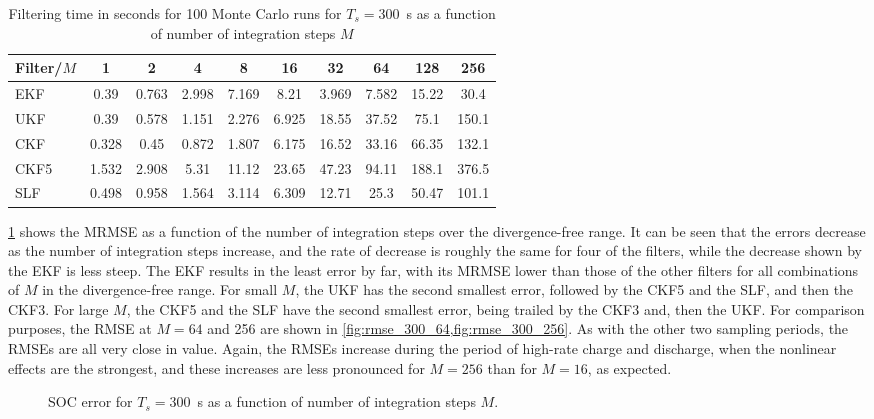 \documentclass[../zhang_thesis.tex]{subfiles}
\begin{document}
\begin{table}[h]
\centering
\caption{Filtering time in seconds for 100 Monte Carlo runs for $T_s=300$~s as a function of number of integration steps $M$}
\begin{tabular}{@{}lccccccccc@{}}
\toprule
Filter/$M$ & 1     & 2     & 4     & 8     & 16    & 32    & 64    & 128   & 256   \\ \midrule
EKF        & 0.39  & 0.763 & 2.998 & 7.169 & 8.21  & 3.969 & 7.582 & 15.22 & 30.4  \\
UKF        & 0.39  & 0.578 & 1.151 & 2.276 & 6.925 & 18.55 & 37.52 & 75.1  & 150.1 \\
CKF        & 0.328 & 0.45  & 0.872 & 1.807 & 6.175 & 16.52 & 33.16 & 66.35 & 132.1 \\
CKF5       & 1.532 & 2.908 & 5.31  & 11.12 & 23.65 & 47.23 & 94.11 & 188.1 & 376.5 \\
SLF        & 0.498 & 0.958 & 1.564 & 3.114 & 6.309 & 12.71 & 25.3  & 50.47 & 101.1 \\ \bottomrule
\end{tabular}
\label{tab:time_300}
\end{table}

\cref{fig:mrmse_300} shows the MRMSE as a function of the number of integration steps over the divergence-free range. It can be seen that the errors decrease as the number of integration steps increase, and the rate of decrease is roughly the same for four of the filters, while the decrease shown by the EKF is less steep. The EKF results in the least error by far, with its MRMSE lower than those of the other filters for all combinations of $M$ in the divergence-free range. For small $M$, the UKF has the second smallest error, followed by the CKF5 and the SLF, and then the CKF3. For large $M$, the CKF5 and the SLF have the second smallest error, being trailed by the CKF3 and, then the UKF. For comparison purposes, the RMSE at $M=64$ and 256 are shown in \cref{fig:rmse_300_64,fig:rmse_300_256}. As with the other two sampling periods, the RMSEs are all very close in value. Again, the RMSEs increase during the period of high-rate charge and discharge, when the nonlinear effects are the strongest, and these increases are less pronounced for $M=256$ than for $M=16$, as expected.

\begin{figure}[b]
\centering
%
\caption{SOC error for $T_s=300$~s as a function of number of integration steps $M$.}
\label{fig:mrmse_300}
\end{figure}

%

%
\end{document}
